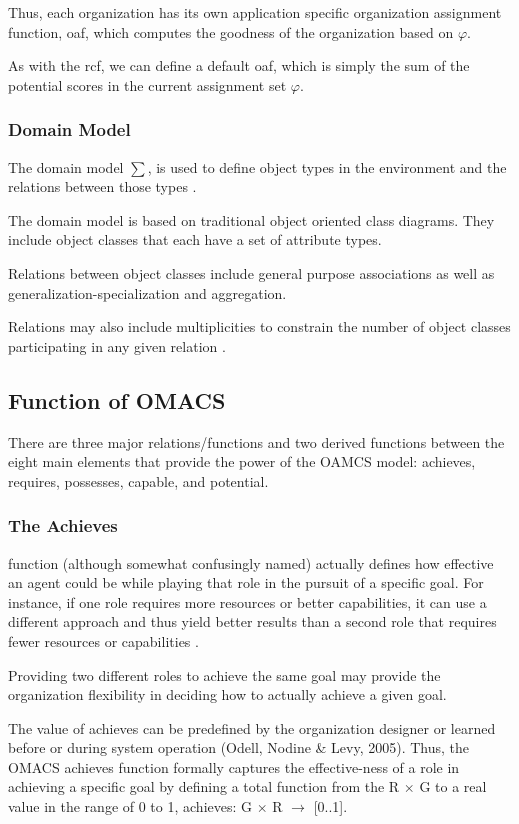 Thus, each organization has its own application specific organization assignment function, oaf, which computes the goodness of the organization based on $\varphi$. 
	
As with the rcf, we can define a default  oaf, which is simply the sum of the potential scores in the current assignment set $\varphi$.
                     
 
\subsubsection{Domain Model} 

The domain model $\sum$, is used to define object types in the environment 
and the relations between those types \cite{omacs2}.

The domain model is based on traditional object oriented class diagrams. They
include object classes that each have a set of attribute types. 

Relations between object classes include general purpose associations
 as well as generalization-specialization and aggregation.
 
Relations may also include multiplicities to constrain the number of object classes participating in
any given relation \cite{omacs2}.
 
\subsection{Function of OMACS}

There are three major relations/functions and two derived functions between the eight main elements that provide the power of the OAMCS model: achieves, requires, possesses, capable, and potential. 
\subsubsection{The Achieves}
function (although somewhat confusingly named) actually defines how effective an agent could be while playing that role in the pursuit of a specific goal. For instance, if one role requires more resources or better capabilities, it can use a different approach and thus yield better results than a second role that requires fewer resources or capabilities \cite{omacs4}.

Providing two different roles to achieve the same goal  may provide the organization flexibility in deciding how to actually achieve a given goal.

The value of achieves can be predefined by the organization designer or learned before or during system operation (Odell, Nodine \& Levy, 2005). Thus, the OMACS achieves function formally captures the effective-ness of a role in achieving a specific goal by defining a total function from the R $\times$ G to a real value in the range of 0 to 1, achieves: G $\times$ R $\rightarrow$ {[}0..1{]}.
 

